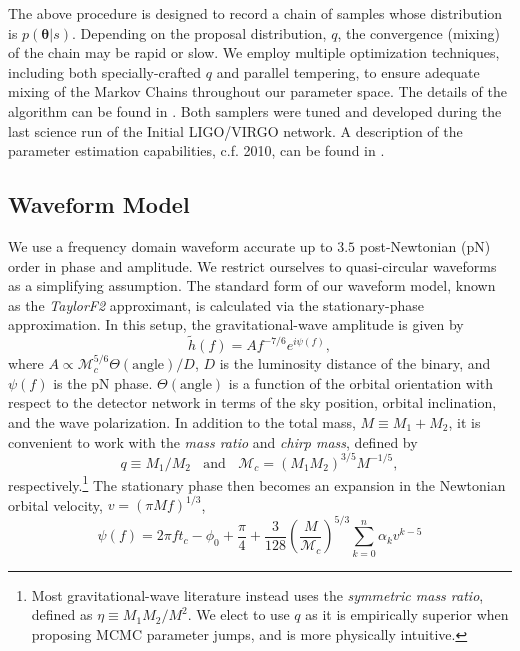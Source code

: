 \documentclass[11pt,a4paper]{emulateapj}
\newcommand{\thpara}{\boldsymbol{\theta}}
\newcommand{\chmass}{\mathcal{M}_c}
\begin{document}
The above procedure is designed to record a chain of samples whose
distribution is $p\left(\thpara|s\right)$.  Depending on
the proposal distribution, $q$, the convergence (mixing) of the chain
may be rapid or slow.  We employ multiple optimization techniques,
including both specially-crafted $q$ and parallel tempering, to ensure
adequate mixing of the Markov Chains throughout our parameter space.
The details of the algorithm can be found in
\citep{Sluys08,spinspiral2009, spinspiral2010}.  Both samplers were tuned and 
developed during the last science run of the Initial LIGO/VIRGO network.  
A description of the parameter estimation capabilities, c.f. 2010, can be found
in \cite{S6PE}.
  
 
\subsection{Waveform Model}
\label{waveformSection}
  
We use a frequency domain waveform accurate up to $3.5$
post-Newtonian (pN) order in phase and amplitude.  We restrict ourselves to
quasi-circular waveforms as a simplifying assumption.  The standard
form of our waveform model, known as the \textit{TaylorF2}
approximant, is calculated via the stationary-phase approximation.
  In this setup, the gravitational-wave
amplitude is given by
\begin{equation}
\tilde{h}(f) = A f^{-7/6}e^{i \psi(f)},
\label{amplitude}
\end{equation}
where $A \propto \chmass^{5/6}\Theta(\text{angle})/D$, $D$ is
the luminosity distance of the binary, and $\psi(f)$ is the pN phase.
$\Theta(\text{angle})$ is a function of the orbital orientation with
respect to the detector network in terms of the sky position, orbital
inclination, and the wave polarization.  In addition to the total
mass, $M\equiv M_1+M_2$, it is convenient to work with the
\textit{mass ratio} and \textit{chirp mass}, defined by
\begin{equation}
  q\equiv M_1/M_2~~~~\text{and}~~~~\chmass = (M_1 M_2)^{3/5} M^{-1/5},
\end{equation}
respectively.\footnote{Most gravitational-wave literature instead uses the \textit{symmetric mass ratio}, defined as $\eta \equiv M_1 M_2 / M^2$.  We elect to use $q$ as it is empirically superior when proposing MCMC parameter jumps, and is more physically intuitive.}  The stationary phase then becomes an expansion in the 
Newtonian orbital velocity, $v=(\pi M f)^{1/3}$, 
\begin{equation}
\psi(f) = 2 \pi f t_c - \phi_0 + \frac{\pi}{4} + \frac{3}{128}\left(\frac{M}{\chmass}\right)^{5/3}\sum^{n}_{k=0}\alpha_{k}v^{k-5}
\label{phase}
\end{equation}
\end{document}
